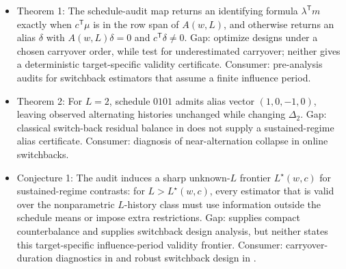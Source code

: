 \documentclass[11pt]{article}
\newcommand{\transpose}{\mathsf{T}}
\theoremstyle{definition}
\theoremstyle{plain}
\theoremstyle{remark}
\begin{document}
\begin{itemize}[leftmargin=2em]
\item Theorem 1: The schedule-audit map returns an identifying formula \(\lambda^\transpose m\) exactly when \(c^\transpose\mu\) is in the row span of \(A(w,L)\), and otherwise returns an alias \(\delta\) with \(A(w,L)\delta=0\) and \(c^\transpose\delta\neq0\). Gap: \citet{BojinovSimchiLeviZhao2023} optimize designs under a chosen carryover order, while \citet{MissaultMasoero2025} test for underestimated carryover; neither gives a deterministic target-specific validity certificate. Consumer: pre-analysis audits for switchback estimators that assume a finite influence period.
\item Theorem 2: For \(L=2\), schedule \(0101\) admits alias vector \((1,0,-1,0)\), leaving observed alternating histories unchanged while changing \(\Delta_2\). Gap: classical switch-back residual balance in \citet{OmanSeiden1988} does not supply a sustained-regime alias certificate. Consumer: diagnosis of near-alternation collapse in online switchbacks.
\item Conjecture 1: The audit induces a sharp unknown-\(L\) frontier \(L^\star(w,c)\) for sustained-regime contrasts: for \(L>L^\star(w,c)\), every estimator that is valid over the nonparametric \(L\)-history class must use information outside the schedule means or impose extra restrictions. Gap: \citet{AguirreMattarMagisWeinberg2011} supplies compact counterbalance and \citet{BojinovSimchiLeviZhao2023} supplies switchback design analysis, but neither states this target-specific influence-period validity frontier. Consumer: carryover-duration diagnostics in \citet{MissaultMasoero2025} and robust switchback design in \citet{MissaultMasoeroDelbeRichardsonImbens2025}.
\end{itemize}
\end{document}
